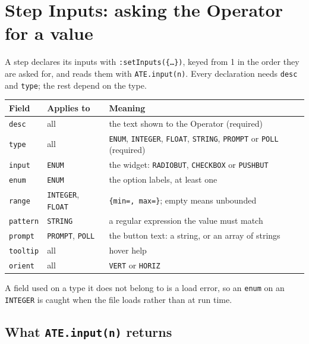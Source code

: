 \chapter{Step Inputs: asking the Operator for a value}\label{ch:inputs}

A step declares its inputs with \texttt{:setInputs(\{\dots\})}, keyed from 1 in the order they
are asked for, and reads them with \texttt{ATE.input(n)}. Every declaration needs \texttt{desc}
and \texttt{type}; the rest depend on the type.

\begin{center}
\footnotesize
\begin{tabular}{@{}>{\raggedright\arraybackslash}p{1.8cm}>{\raggedright\arraybackslash}p{3.0cm}>{\raggedright\arraybackslash}p{9.4cm}@{}}
\toprule
Field & Applies to & Meaning \\
\midrule
\texttt{desc} & all & the text shown to the Operator (required) \\
\texttt{type} & all & \texttt{ENUM}, \texttt{INTEGER}, \texttt{FLOAT}, \texttt{STRING},
  \texttt{PROMPT} or \texttt{POLL} (required) \\
\texttt{input} & \texttt{ENUM} & the widget: \texttt{RADIOBUT}, \texttt{CHECKBOX} or
  \texttt{PUSHBUT} \\
\texttt{enum} & \texttt{ENUM} & the option labels, at least one \\
\texttt{range} & \texttt{INTEGER}, \texttt{FLOAT} & \texttt{\{min=, max=\}}; empty means
  unbounded \\
\texttt{pattern} & \texttt{STRING} & a regular expression the value must match \\
\texttt{prompt} & \texttt{PROMPT}, \texttt{POLL} & the button text: a string, or an array of
  strings \\
\texttt{tooltip} & all & hover help \\
\texttt{orient} & all & \texttt{VERT} or \texttt{HORIZ} \\
\bottomrule
\end{tabular}
\end{center}

A field used on a type it does not belong to is a load error, so an \texttt{enum} on an
\texttt{INTEGER} is caught when the file loads rather than at run time.

\section{What \texttt{ATE.input(n)} returns}

